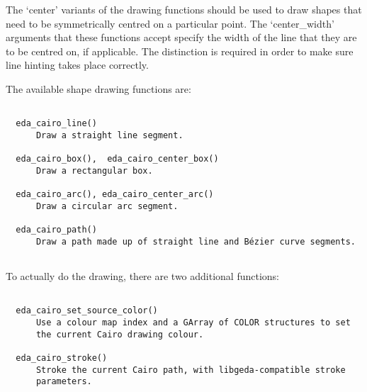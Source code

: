   The `center' variants of the drawing functions should be used to draw shapes that need to be symmetrically centred on a particular point. The `center\_width' arguments that these functions accept specify the width of the line that they are to be centred on, if applicable. The distinction is required in order to make sure line hinting takes place correctly. 


  The available shape drawing functions are: \begin{verbatim}
	
  eda_cairo_line()
      Draw a straight line segment.

  eda_cairo_box(),  eda_cairo_center_box()
      Draw a rectangular box.

  eda_cairo_arc(), eda_cairo_center_arc()
      Draw a circular arc segment.

  eda_cairo_path()
      Draw a path made up of straight line and Bézier curve segments.
  
\end{verbatim}
 To actually do the drawing, there are two additional functions: \begin{verbatim}
	
  eda_cairo_set_source_color()
      Use a colour map index and a GArray of COLOR structures to set
      the current Cairo drawing colour.

  eda_cairo_stroke()
      Stroke the current Cairo path, with libgeda-compatible stroke
      parameters.
  
\end{verbatim}


